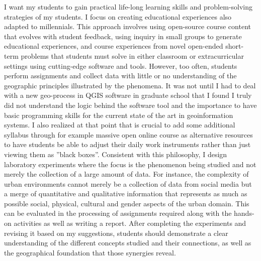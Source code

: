 I want my students to gain practical life-long learning skills and problem-solving strategies of my students. I focus on creating educational experiences also adapted to millennials. This approach involves using open-source course content that evolves with student feedback, using inquiry in small groups to generate educational experiences, and course experiences from novel open-ended short-term problems that students must solve in either classroom or extracurricular settings using cutting-edge software and tools. However, too often, students perform assignments and collect data with little or no understanding of the geographic principles illustrated by the phenomena. It was not until I had to deal with a new geo-process in QGIS software in graduate school that I found I truly did not understand the logic behind the software tool and the importance to have basic programming skills for the current state of the art in geoinformation systems. I also realized at that point that is crucial to add some additional syllabus through for example massive open online course as alternative resources to have students be able to adjust their daily work instruments rather than just viewing them as ”black boxes”. Consistent with this philosophy, I design laboratory experiments where the focus is the phenomenon being studied and not merely the collection of a large amount of data. For instance, the complexity of urban environments cannot merely be a collection of data from social media but a merge of quantitative and qualitative information that represents as much as possible social, physical, cultural and gender aspects of the urban domain. This can be evaluated in the processing of assignments required along with the hands-on activities as well as writing a report. After completing the experiments and revising it based on my suggestions, students should demonstrate a clear understanding of the different concepts studied and their connections, as well as the geographical foundation that those synergies reveal.\par

